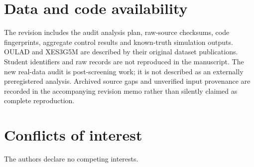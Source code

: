 \section*{Data and code availability}

The revision includes the audit analysis plan, raw-source checksums, code fingerprints, aggregate control results and known-truth simulation outputs. OULAD and XES3G5M are described by their original dataset publications. Student identifiers and raw records are not reproduced in the manuscript. The new real-data audit is post-screening work; it is not described as an externally preregistered analysis. Archived source gaps and unverified input provenance are recorded in the accompanying revision memo rather than silently claimed as complete reproduction.

\section*{Conflicts of interest}
The authors declare no competing interests.
